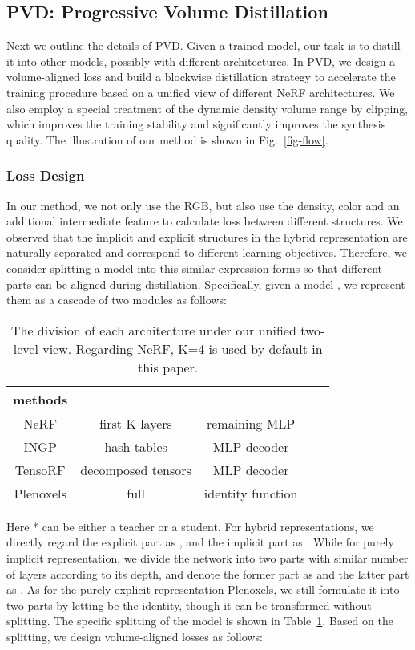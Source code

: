 \documentclass[letterpaper]{article} \usepackage{aaai23}  \usepackage{times}  \usepackage{helvet}  \usepackage{courier}  \usepackage[hyphens]{url}  \usepackage{graphicx} \urlstyle{rm} \def\UrlFont{\rm}  \usepackage{natbib}  \usepackage{caption} \frenchspacing  \setlength{\pdfpagewidth}{8.5in}  \setlength{\pdfpageheight}{11in}  \usepackage{multirow}
\begin{document}
\subsection{PVD: Progressive Volume Distillation}
Next we outline the details of PVD. Given a trained model, our task is to distill it into other models, possibly with different architectures. In PVD, we design a volume-aligned loss and build a blockwise distillation strategy to accelerate the training procedure based on a unified view of different NeRF architectures. We also employ a special treatment of the dynamic density volume range by clipping, which improves the training stability and significantly improves the synthesis quality.
The illustration of our method is shown in Fig.~\ref{fig-flow}.
\subsubsection{Loss Design}
 In our method, we not only use the RGB, but also use the density, color and an additional intermediate feature to calculate loss between different structures. We observed that the implicit and explicit structures in the hybrid representation are naturally separated and correspond to different learning objectives. Therefore, we consider splitting a model into this similar expression forms so that different parts can be aligned during distillation. Specifically, given a model , we represent them as a cascade of two modules as follows:
 
 
\begin{table}[h]
\centering
\begin{tabular}{ccccc}
\hline
methods &  &  \\ \hline
NeRF   & first K layers & remaining MLP \\
INGP & hash tables & MLP decoder \\
TensoRF & decomposed tensors & MLP decoder \\
Plenoxels & full & identity function \\ \hline
\end{tabular}
\caption{The division of each architecture under our unified two-level view. Regarding NeRF, K=4 is used by default in this paper.}
\label{table-split}
\end{table}
Here * can be either a teacher or a student. For hybrid representations, we directly regard the explicit part as , and the implicit part as . While for purely implicit representation, we divide the network into two parts with similar number of layers according to its depth, and denote the former part as  and the latter part as . As for the purely explicit representation Plenoxels, we still formulate it into two parts by letting  be the identity, though it can be transformed without splitting. The specific splitting of the model is shown in Table~\ref{table-split}. Based on the splitting, we design volume-aligned losses as follows:
 
\end{document}
